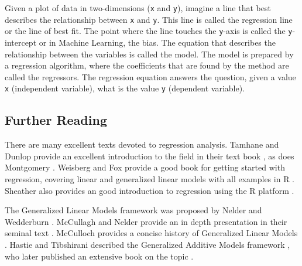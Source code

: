\begin{bibunit}
Given a plot of data in two-dimensions (\texttt{x} and \texttt{y}), imagine a line that best describes the relationship between \texttt{x} and \texttt{y}. This line is called the regression line or the line of best fit. The point where the line touches the \texttt{y}-axis is called the \texttt{y}-intercept or in Machine Learning, the bias. The equation that describes the relationship between the variables is called the model. The model is prepared by a regression algorithm, where the coefficients that are found by the method are called the regressors. The regression equation answers the question, given a value \texttt{x} (independent variable), what is the value \texttt{y} (dependent variable).

\subsection{Further Reading}
There are many excellent texts devoted to regression analysis.
Tamhane and Dunlop provide an excellent introduction to the field in their text book \cite{Tamhane2000}, as does Montgomery \cite{Montgomery2001}.
Weisberg and Fox provide a good book for getting started with regression, covering linear and generalized linear models with all examples in R \cite{Weisberg2010}. Sheather also provides an good introduction to regression using the R platform \cite{Sheather2009}.

The Generalized Linear Models framework was proposed by Nelder and Wedderburn \cite{Nelder1972}. McCullagh and Nelder provide an in depth presentation in their seminal text \cite{McCullagh1989}. McCulloch provides a concise history of Generalized Linear Models \cite{McCulloch2000}.
Hastie and Tibshirani described the Generalized Additive Models framework \cite{Hastie1986}, who later published an extensive book on the topic \cite{Hastie1990}.

\putbib
\end{bibunit}

\newpage\begin{bibunit}\putbib\end{bibunit}
\newpage\begin{bibunit}\putbib\end{bibunit}
\newpage\begin{bibunit}\putbib\end{bibunit}
\newpage\begin{bibunit}\putbib\end{bibunit}
\newpage\begin{bibunit}\putbib\end{bibunit}

